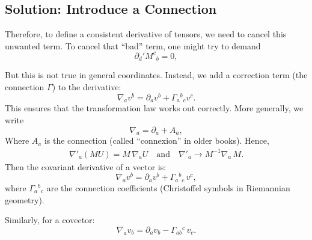 \documentclass[14pt]{article} %
\begin{document}
\subsection*{Solution: Introduce a Connection}
Therefore, to define a consistent derivative of tensors, we need to cancel this unwanted term.
To cancel that ``bad'' term, one might try to demand
\[
\partial_d' M^c{}_b = 0,
\]

But this is not true in general coordinates. Instead, we add a correction term (the connection $\Gamma$) to the derivative:
\[
\nabla_a v^b = \partial_a v^b + \Gamma_a {}^b{}_c v^c.
\]
This ensures that the transformation law works out correctly. More generally, we write
\[
\nabla_a = \partial_a + A_a,
\]
Where $A_a$ is the connection (called ``connexion'' in older books). Hence,
\begin{align*}
\nabla'_a (M U) = M \,\nabla_a U \quad \text{and} \quad \nabla'_a \rightarrow M^{-1} \nabla_a \, M.
\end{align*}
Then the covariant derivative of a vector is:
\[
\nabla_a v^b = \partial_a v^b + \Gamma_a{}^b{}_c \, v^c,
\]
where $\Gamma_a{}^b{}_c$ are the connection coefficients (Christoffel symbols in Riemannian geometry).

Similarly, for a covector:
\[
\nabla_a v_b = \partial_a v_b - \Gamma_{ab}{}^c\, v_c.
\]
\end{document}
